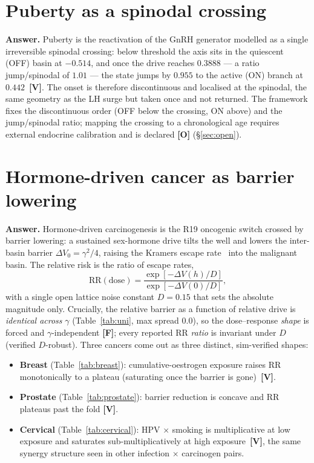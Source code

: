 \documentclass[11pt]{article}
\newcommand{\gradeV}{\textcolor{verified}{\textbf{[V]}}}
\newcommand{\gradeF}{\textcolor{forced}{\textbf{[F]}}}
\newcommand{\gradeO}{\textcolor{open}{\textbf{[O]}}}
\begin{document}
\section{Puberty as a spinodal crossing}

\textbf{Answer.} Puberty is the reactivation of the GnRH generator modelled as a single irreversible spinodal
crossing: below threshold the axis sits in the quiescent (OFF) basin at $-0.514$,
and once the drive reaches $0.3888$ --- a ratio jump/spinodal of
$1.01$ --- the state jumps by $0.955$ to the
active (ON) branch at $0.442$~\gradeV{}. The onset is therefore discontinuous and
localised at the spinodal, the same geometry as the LH surge but taken once and not returned. The framework
fixes the discontinuous order (OFF below the crossing, ON above) and the jump/spinodal ratio; mapping the
crossing to a chronological age requires external endocrine calibration and is declared \gradeO{}
(\S\ref{sec:open}).

\section{Hormone-driven cancer as barrier lowering}

\textbf{Answer.} Hormone-driven carcinogenesis is the R19 oncogenic switch crossed by barrier lowering: a
sustained sex-hormone drive tilts the well and lowers the inter-basin barrier $\Delta V_0=\gamma^2/4$, raising
the Kramers escape rate~\cite{kramers} into the malignant basin. The relative risk is the ratio of escape
rates,
\begin{equation}
\mathrm{RR}(\mathrm{dose}) = \frac{\exp[-\Delta V(h)/D]}{\exp[-\Delta V(0)/D]},
\end{equation}
with a single open lattice noise constant $D=0.15$ that sets the absolute magnitude
only. Crucially, the relative barrier as a function of relative drive is \emph{identical across} $\gamma$
(Table~\ref{tab:uni}, max spread $0.0$), so the dose--response \emph{shape} is forced and $\gamma$-independent
\gradeF{}; every reported RR \emph{ratio} is invariant under $D$ (verified $D$-robust). Three cancers come out
as three distinct, sim-verified shapes:

\begin{itemize}[leftmargin=1.2em,itemsep=2pt]
\item \textbf{Breast} (Table~\ref{tab:breast}): cumulative-oestrogen exposure raises RR monotonically to a
plateau (saturating once the barrier is gone)~\gradeV{}.
\item \textbf{Prostate} (Table~\ref{tab:prostate}): barrier reduction is concave and RR plateaus past the fold
\gradeV{}.
\item \textbf{Cervical} (Table~\ref{tab:cervical}): HPV $\times$ smoking is multiplicative at low exposure and
saturates sub-multiplicatively at high exposure~\gradeV{}, the same synergy structure seen in other
infection $\times$ carcinogen pairs.
\end{itemize}
\end{document}

